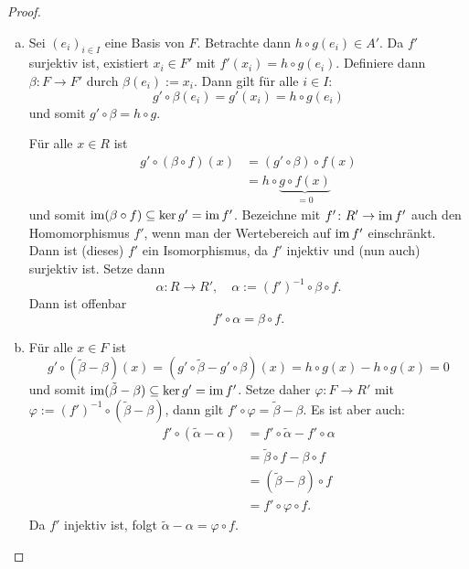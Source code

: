 \begin{proof}
  \begin{enumerate}[(a)]
    \item 
      Sei ${(e_i)}_{i \in I}$ eine Basis von $F$.
      Betrachte dann $h \circ g (e_i) \in A'$.
      Da $f'$ surjektiv ist, existiert $x_i \in F'$ mit $f'(x_i) = h \circ g(e_i)$.
      Definiere dann $\beta \colon F \to F'$ durch $\beta(e_i) := x_i$.
      Dann gilt für alle $i \in I$:
      \begin{equation*}
        g' \circ \beta(e_i) = g'(x_i) = h \circ g(e_i)
      \end{equation*}
      und somit $g' \circ \beta = h \circ g$.

      Für alle $x \in R$ ist
      \begin{align*}
        g' \circ (\beta \circ f) (x)
          & = (g' \circ \beta) \circ f (x) \\
          & = h \circ \underset{=0}{\underbrace{g \circ f(x)}}
      \end{align*}
      und somit $\operatorname{im} (\beta \circ f) \subseteq  \ker g' = \operatorname{im} f'$.
      Bezeichne mit $f'\colon R' \to \operatorname{im} f'$ auch den Homomorphismus $f'$, wenn man der Wertebereich auf $\operatorname{im} f'$ einschränkt.
      Dann ist (dieses) $f'$ ein Isomorphismus, da $f'$ injektiv und (nun auch) surjektiv ist.
      Setze dann
      \[
        \alpha \colon R \to R',\quad \alpha := {(f')}^{-1} \circ \beta \circ f.
      \]
      Dann ist offenbar
      \begin{equation*}
        f' \circ \alpha = \beta \circ f.
      \end{equation*}
    \item
      Für  alle $x \in F$ ist
      \begin{equation*}
        g' \circ (\tilde\beta - \beta) (x) = (g' \circ \tilde \beta - g' \circ \beta) (x) = h\circ g(x) - h \circ g(x) = 0
      \end{equation*}
      und somit $\operatorname{im} (\tilde\beta - \beta) \subseteq \ker g' = \operatorname{im} f'$.
      Setze daher $\varphi \colon F \to R'$ mit $\varphi := {(f')}^{-1} \circ (\tilde \beta - \beta)$, dann gilt $f' \circ \varphi = \tilde \beta - \beta$.
      Es ist aber auch:
      \begin{align*}
        f' \circ (\tilde\alpha - \alpha)
          & = f' \circ \tilde \alpha - f' \circ \alpha \\
          & = \tilde \beta \circ f - \beta \circ f \\
          & = (\tilde \beta - \beta) \circ f \\
          & = f' \circ \varphi \circ f.
      \end{align*}
      Da $f'$ injektiv ist, folgt $\tilde \alpha - \alpha = \varphi \circ f$.
  \end{enumerate}
\end{proof}
